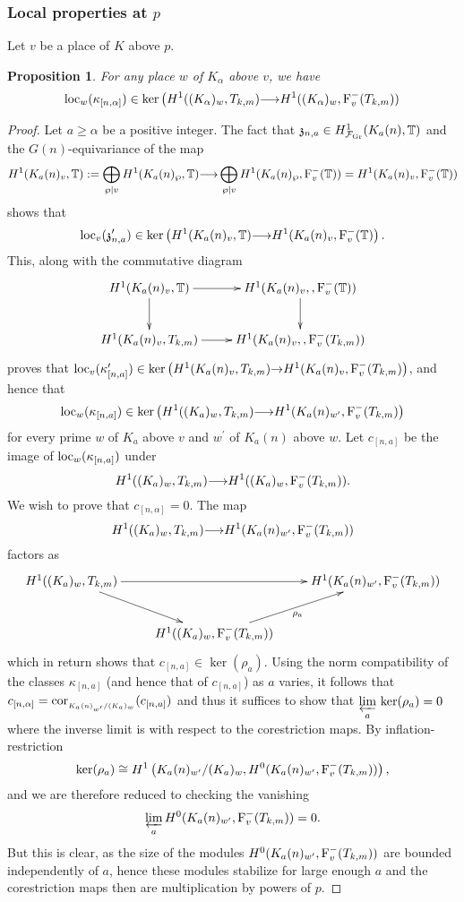 \documentclass[12pt]{amsart}
\numberwithin{equation}{section}
\newtheorem{prop}[thm]{Proposition}
\begin{document}
\subsubsection{Local properties at $p$}
Let $v$ be a place of $K$ above $p$.
\begin{prop}
\label{prop:localpstep1}
For any place  $w$ of $K_\alpha$ above $v$, we have
$$\textup{loc}_w(\kappa_{[n,\alpha]}) \in \ker\left(H^1((K_\alpha)_w,T_{k,m}){\longrightarrow} H^1((K_\alpha)_w,\textup{F}_v^-(T_{k,m}))\right.$$
\end{prop}
\begin{proof}
Let $a\geq \alpha$ be a positive integer. The fact that $\frak{z}_{n,a}\in H^1_{{\mathcal{F}}_{\textup{Gr}}}(K_{a}(n),{\mathbb{T}})$ and the $G(n)$-equivariance of the map
$$H^1(K_{a}(n)_v,{\mathbb{T}}):=\bigoplus_{\wp|v}H^1(K_{a}(n)_{\wp},{\mathbb{T}}){\longrightarrow} \bigoplus_{\wp|v}H^1(K_{a}(n)_{\wp},\textup{F}_v^-({\mathbb{T}}))=H^1(K_{a}(n)_v,\textup{F}_v^-({\mathbb{T}}))$$
shows that
$$\textup{loc}_v(\frak{z}_{n,a}^\prime) \in \ker\left(H^1(K_{a}(n)_v,{\mathbb{T}}){\longrightarrow} H^1(K_{a}(n)_v,\textup{F}_v^-({\mathbb{T}})\right).$$
This, along with the commutative diagram
$$
\xymatrix{H^1(K_{a}(n)_v,{\mathbb{T}})\ar[r]\ar[d]&H^1(K_{a}(n)_v,,\textup{F}_v^-({\mathbb{T}}))\ar[d]\\
H^1(K_{a}(n)_v,T_{k,m})\ar[r]&H^1(K_{a}(n)_v,,\textup{F}_v^-(T_{k,m}))
}$$
proves that $\textup{loc}_v(\kappa_{[n,a]}^\prime) \in \ker\left(H^1(K_{a}(n)_v,T_{k,m}){\rightarrow} H^1(K_{a}(n)_v,\textup{F}_v^-(T_{k,m})\right)$, and hence that
$$\textup{loc}_{w}(\kappa_{[n,a]}) \in \ker\left(H^1((K_{a})_w,T_{k,m}) {\longrightarrow} H^1(K_{a}(n)_{w^\prime},\textup{F}_v^-(T_{k,m})\right)$$
for every prime $w$ of $K_a$ above $v$ and $w^\prime$ of $K_a(n)$ above $w$.
Let $c_{[n,a]}$ be the image of $\textup{loc}_w(\kappa_{[n,a]})$ under
$$H^1((K_{a})_w,T_{k,m}) {\longrightarrow} H^1((K_{a})_{w},\textup{F}_v^-(T_{k,m})).$$
We wish to prove that $c_{[n,\alpha]}=0$.
The map
$$H^1((K_{a})_w,T_{k,m}) {\longrightarrow} H^1(K_{a}(n)_{w^\prime},\textup{F}_v^-(T_{k,m}))$$
factors as
$$\xymatrix{H^1((K_{a})_w,T_{k,m}) \ar[rr]\ar[rd]&&H^1(K_{a}(n)_{w^\prime},\textup{F}_v^-(T_{k,m}))\\
&H^1((K_{a})_{w},\textup{F}_v^-(T_{k,m}))\ar[ru]_{\rho_a}&
}$$
which in return shows that $c_{[n,a]} \in \ker(\rho_a)$. Using the norm compatibility of the classes $\kappa_{[n,a]}$ (and hence that of $c_{[n,a]}$) as $a$ varies, it follows that $c_{[n,\alpha]}=\textup{cor}_{_{K_{a}(n)_{w^\prime}/(K_{a})_{w}}}(c_{[n,a]})$ and thus it suffices to show that $ \displaystyle \varprojlim_{a}\, \ker(\rho_a)=0$ where the inverse limit is with respect to the corestriction maps. By inflation-restriction
$$\ker(\rho_a) \cong H^1\left(K_{a}(n)_{w^\prime}/(K_{a})_{w}, H^0(K_{a}(n)_{w^\prime}, \textup{F}_v^-(T_{k,m}))\right),$$
and we are therefore reduced to checking the vanishing
$$\varprojlim_a H^0(K_{a}(n)_{w^\prime}, \textup{F}_v^-(T_{k,m}))=0.$$
But this is clear, as the size of the modules $H^0(K_{a}(n)_{w^\prime}, \textup{F}_v^-(T_{k,m}))$ are bounded independently of $a$, hence these modules stabilize for large enough $a$ and the corestriction maps then are multiplication by powers of $p$.
\end{proof}
\end{document}

